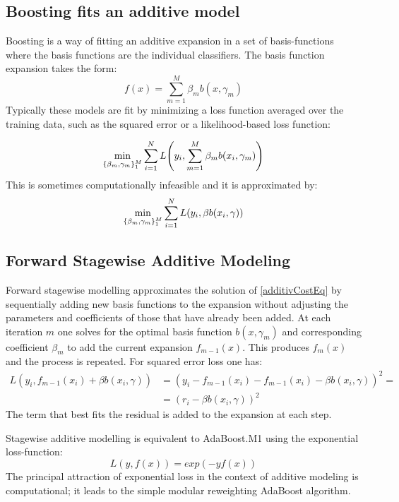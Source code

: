 \documentclass[12pt, letterpaper]{article}
\theoremstyle{definition}
\DeclarePairedDelimiter\autobracket{(}{)}
\newcommand{\br}[1]{\autobracket*{#1}}
\begin{document}
\subsection{Boosting fits an additive model}
Boosting is a way of fitting an additive expansion in a set of basis-functions where the basis functions are the individual classifiers. The basis function expansion takes the form:
\begin{equation}
f(x) = \sum_{m=1}^M \beta_m b(x, \gamma_m)
\end{equation}
Typically these models are fit by minimizing a loss function averaged over the training data, such as the squared error or a likelihood-based loss function:

\begin{equation}
\min_{\{\beta_m, \gamma_m\}_1^M} \sum_{i=1}^N L\br{y_i, \sum_{m=1}^M \beta_m b(x_i, \gamma_m)}
\label{additivCostEq}
\end{equation}
This is sometimes computationally infeasible and it is approximated by:
\begin{equation}
\min_{\{\beta_m, \gamma_m\}_1^M} \sum_{i=1}^N L\br{y_i, \beta b(x_i, \gamma)}
\end{equation}
\subsection{Forward Stagewise Additive Modeling}
Forward stagewise modelling approximates the solution of \ref{additivCostEq} by sequentially adding new basis functions to the expansion without adjusting the parameters and coefficients of those that have already been added. At each iteration $m$ one solves for the optimal basis function $b(x, \gamma_m)$ and corresponding coefficient $\beta_m$ to add the current expansion $f_{m-1}(x)$. This produces $f_m(x)$ and the process is repeated. For squared error loss one has:
\begin{equation}
\begin{aligned}
L(y_i, f_{m-1}(x_i)+\beta b(x_i, \gamma)) &= (y_i-f_{m-1}(x_i)-f_{m-1}(x_i)-\beta b(x_i, \gamma))^2 =\\
 &=(r_i-\beta b(x_i, \gamma))^2
\end{aligned}
\end{equation}
The term that best fits the residual is added to the expansion at each step.

Stagewise additive modelling is equivalent to AdaBoost.M1 using the exponential loss-function:
\begin{equation}
L(y, f(x))  = exp(-yf(x))
\end{equation}
The principal attraction of exponential loss in the context of additive modeling is computational; it leads to the simple modular reweighting AdaBoost algorithm.
\end{document}
